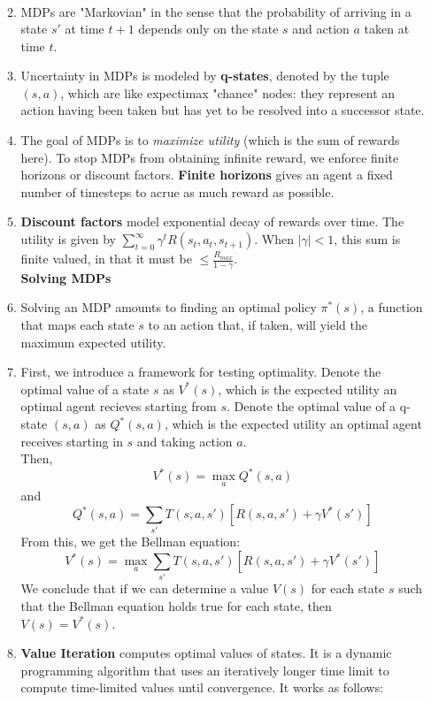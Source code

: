 \documentclass[10pt]{article}
\begin{document}
\begin{multicols}{2}
\begin{enumerate}
\begin{enumerate}
\begin{align*}
            \end{align*}
            \item MDPs are "Markovian" in the sense that the probability of arriving in a state $s'$ at time $t + 1$ depends only on the state $s$ and action $a$ taken at time $t$.
            \item Uncertainty in MDPs is modeled by \textbf{q-states}, denoted by the tuple $(s,a)$, which are like expectimax "chance" nodes: they represent an action having been taken but has yet to be resolved into a successor state.
            \item The goal of MDPs is to \textit{maximize utility} (which is the sum of rewards here). To stop MDPs from obtaining infinite reward, we enforce finite horizons or discount factors. \textbf{Finite horizons} gives an agent a fixed number of timesteps to acrue as much reward as possible.
            \item \textbf{Discount factors} model exponential decay of rewards over time. The utility is given by $\sum_{t=0}^{\infty} \gamma^t R(s_t,a_t,s_{t+1})$. When $|\gamma| < 1$, this sum is finite valued, in that it must be $ \leq \frac{R_{max}}{1-\gamma}$. \\[8 pt]
            \textbf{Solving MDPs}
            \item Solving an MDP amounts to finding an optimal policy $\pi^*(s)$, a function that maps each state $s$ to an action that, if taken, will yield the maximum expected utility.
            \item First, we introduce a framework for testing optimality. Denote the optimal value of a state $s$ as $V^*(s)$, which is the expected utility an optimal agent recieves starting from $s$. Denote the optimal value of a q-state $(s,a)$ as $Q^*(s,a)$, which is the expected utility an optimal agent receives starting in $s$ and taking action $a$. \\
            Then, 
            $$V^*(s)=\max_{a}Q^*(s,a)$$ and $$Q^*(s,a)=\sum_{s'} T(s,a,s') [R(s,a,s')+\gamma V^*(s')]$$
            From this, we get the Bellman equation:
            $$V^*(s)=\max_{a}\sum_{s'} T(s,a,s') [R(s,a,s')+\gamma V^*(s')]$$
            We conclude that if we can determine a value $V(s)$ for each state $s$ such that the Bellman equation holds true for each state, then $V(s)=V^*(s)$.
            \item \textbf{Value Iteration} computes optimal values of states. It is a dynamic programming algorithm that uses an iteratively longer time limit to compute time-limited values until convergence. It works as follows:

\end{enumerate}
\end{enumerate}
\end{multicols}
\end{document}
